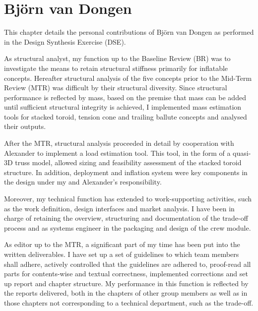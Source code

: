 \section{Bj{\"o}rn van Dongen}
This chapter details the personal contributions of Bj{\"o}rn van Dongen as performed in the Design Synthesis Exercise (DSE).

As structural analyst, my function up to the Baseline Review (BR) was to investigate the means to retain structural stiffness primarily for inflatable concepts. Hereafter structural analysis of the five concepts prior to the Mid-Term Review (MTR) was difficult by their structural diversity. Since structural performance is reflected by mass, based on the premise that mass can be added until sufficient structural integrity is achieved, I implemented mass estimation tools for stacked toroid, tension cone and trailing ballute concepts and analysed their outputs. 

After the MTR, structural analysis proceeded in detail by cooperation with Alexander to implement a load estimation tool. This tool, in the form of a quasi-3D truss model, allowed sizing and feasibility assessment of the stacked toroid structure. In addition, deployment and inflation system were key components in the design under my and Alexander's responsibility.

Moreover, my technical function has extended to work-supporting activities, such as the work definition, design interfaces and market analysis. I have been in charge of retaining the overview, structuring and documentation of the trade-off process and as systems engineer in the packaging and design of the crew module.

As editor up to the MTR, a significant part of my time has been put into the written deliverables. I have set up a set of guidelines to which team members shall adhere, actively controlled that the guidelines are adhered to, proof-read all parts for contents-wise and textual correctness, implemented corrections and set up report and chapter structure. My performance in this function is reflected by the reports delivered, both in the chapters of other group members as well as in those chapters not corresponding to a technical department, such as the trade-off.

